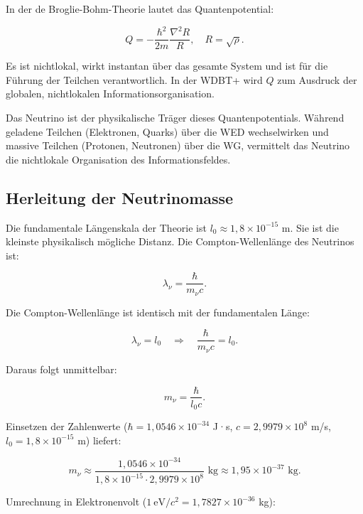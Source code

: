 \documentclass[12pt,a4paper]{article}
\begin{document}
In der de Broglie-Bohm-Theorie lautet das Quantenpotential:

\begin{equation}
Q = -\frac{\hbar^2}{2m} \frac{\nabla^2 R}{R}, \quad R = \sqrt{\rho}.
\end{equation}

Es ist nichtlokal, wirkt instantan über das gesamte System und ist für die Führung der Teilchen verantwortlich. In der WDBT+ wird $Q$ zum Ausdruck der globalen, nichtlokalen Informationsorganisation.

Das Neutrino ist der physikalische Träger dieses Quantenpotentials. Während geladene Teilchen (Elektronen, Quarks) über die WED wechselwirken und massive Teilchen (Protonen, Neutronen) über die WG, vermittelt das Neutrino die nichtlokale Organisation des Informationsfeldes.

\subsection{Herleitung der Neutrinomasse}

Die fundamentale Längenskala der Theorie ist $l_0 \approx 1,8 \times 10^{-15}$ m. Sie ist die kleinste physikalisch mögliche Distanz. Die Compton-Wellenlänge des Neutrinos ist:

\begin{equation}
\lambda_{\nu} = \frac{\hbar}{m_{\nu}c}.
\end{equation}

Die Compton-Wellenlänge ist identisch mit der fundamentalen Länge:

\begin{equation}
\lambda_{\nu} = l_0 \quad \Rightarrow \quad \frac{\hbar}{m_{\nu}c} = l_0.
\end{equation}

Daraus folgt unmittelbar:

\begin{equation}
\boxed{m_{\nu} = \frac{\hbar}{l_0c}}.
\end{equation}

Einsetzen der Zahlenwerte ($\hbar = 1,0546 \times 10^{-34}$ J·s, $c = 2,9979 \times 10^8$ m/s, $l_0 = 1,8 \times 10^{-15}$ m) liefert:

\begin{equation}
m_\nu \approx \frac{1,0546 \times 10^{-34}}{1,8 \times 10^{-15} \cdot 2,9979 \times 10^8} \text{ kg} \approx 1,95 \times 10^{-37} \text{ kg}.
\end{equation}

Umrechnung in Elektronenvolt ($1\ \text{eV}/c^2 = 1,7827 \times 10^{-36}$ kg):
\end{document}
